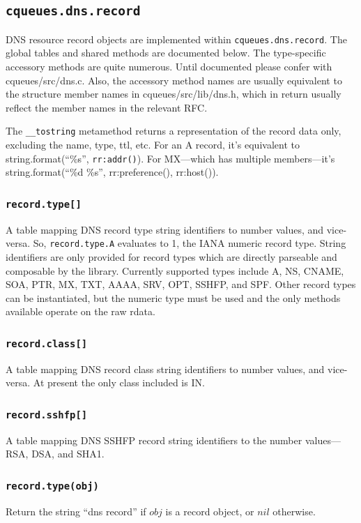 \documentclass[11pt, oneside]{memoir}
\newcommand*{\routine}[1]{\texttt{#1}\xspace}
\newcommand*{\fn}[1]{\texttt{#1}\xspace}
\newcommand*{\method}[1]{\texttt{#1}\xspace}
\newcommand*{\module}[1]{\texttt{#1}\xspace}
\newcounter{toccols}
\newenvironment{Module}[1]{
	\subsection{\texttt{#1}}
	\addtocontents{toc}{
		\protect\begin{multicols}{\value{toccols}}
	}
}{
	\addtocontents{toc}{\protect\end{multicols}}
}
\begin{document}
\begin{Module}{cqueues.dns.record}

DNS resource record objects are implemented within \module{cqueues.dns.record}. The global tables and shared methods are documented below. The type-specific accessory methods are quite numerous. Until documented please confer with cqueues/src/dns.c. Also, the accessory method names are usually equivalent to the structure member names in cqueues/src/lib/dns.h, which in return usually reflect the member names in the relevant RFC.

The \fn{\_\_tostring} metamethod returns a representation of the record data only, excluding the name, type, ttl, etc. For an A record, it's equivalent to string.format(``\%s'', \fn{rr:addr()}). For MX---which has multiple members---it's string.format(``\%d \%s'', rr:preference(), rr:host()).

\subsubsection[\fn{record.type[]}]{\fn{record.type[]}}

A table mapping DNS record type string identifiers to number values, and vice-versa. So, \method{record.type.A} evaluates to 1, the IANA numeric record type. String identifiers are only provided for record types which are directly parseable and composable by the library. Currently supported types include A, NS, CNAME, SOA, PTR, MX, TXT, AAAA, SRV, OPT, SSHFP, and SPF. Other record types can be instantiated, but the numeric type must be used and the only methods available operate on the raw rdata.

\subsubsection[\fn{record.class[]}]{\fn{record.class[]}}

A table mapping DNS record class string identifiers to number values, and vice-versa. At present the only class included is IN.

\subsubsection[\fn{record.sshfp[]}]{\fn{record.sshfp[]}}

A table mapping DNS SSHFP record string identifiers to the number values---RSA, DSA, and SHA1.

\subsubsection[\routine{record.type}]{\routine{record.type(obj)}}
Return the string ``dns record'' if $obj$ is a record object, or $nil$ otherwise.


\end{Module}
\end{document}
